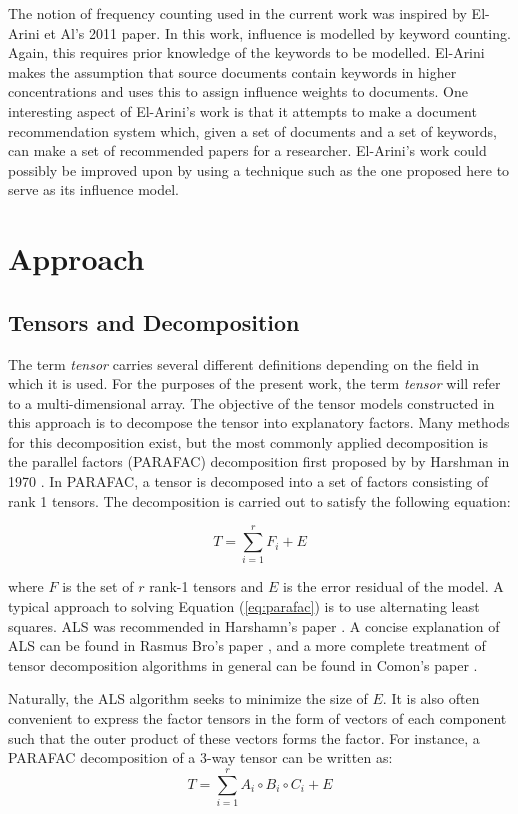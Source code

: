 \documentclass{article}
\begin{document}
The notion of frequency counting used in the current work was inspired
by El-Arini et Al's 2011 paper\cite{el-arini2011}.  In this work,
influence is modelled by keyword counting.  Again, this requires prior
knowledge of the keywords to be modelled.  El-Arini makes the
assumption that source documents contain keywords in higher
concentrations and uses this to assign influence weights to documents.
One interesting aspect of El-Arini's work is that it attempts to make
a document recommendation system which, given a set of documents and
a set of keywords, can make a set of recommended papers for
a researcher.  El-Arini's work could possibly be improved upon by
using a technique such as the one proposed here to serve as its
influence model.

\section{Approach}
\subsection{Tensors and Decomposition}
The term {\em tensor} carries several different definitions depending
on the field in which it is used.  For the purposes of the present
work, the term {\em tensor} will refer to a multi-dimensional array.
The objective of the tensor models constructed in this approach is to
decompose the tensor into explanatory factors.  Many methods for this
decomposition exist, but the most commonly applied decomposition is
the parallel factors (PARAFAC) decomposition first proposed by by
Harshman in 1970 \cite{harshman1970}.  In PARAFAC, a tensor is
decomposed into a set of factors consisting of rank 1 tensors.  The
decomposition is carried out to satisfy the following equation:

\begin{equation}
    \label{eq:parafac}
    T = \displaystyle\sum_{i=1}^{r} F_i + E
\end{equation}

where $F$ is the set of $r$ rank-1 tensors and $E$ is the error
residual of the model.  A typical approach to solving Equation
(\ref{eq:parafac}) is to use alternating least squares.  ALS was 
recommended in Harshamn's paper \cite{harshman1970}.  A concise
explanation of ALS can be found in Rasmus Bro's paper \cite{bro1997},
and a more complete treatment of tensor decomposition algorithms in
general can be found in Comon's paper \cite{comon2009}.  

Naturally, the ALS algorithm seeks to minimize
the size of $E$.  It is also often convenient to express the factor
tensors in the form of vectors of each component such that the outer
product of these vectors forms the factor.  For instance,
a PARAFAC decomposition of a 3-way tensor can be written as:
\begin{equation}
    \label{eq:parafac-comp}
    T = \displaystyle\sum_{i=1}^{r} A_i \circ B_i \circ C_i + E
\end{equation}
\end{document}
